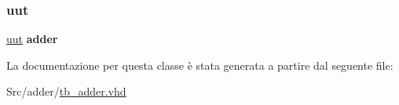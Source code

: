 \mbox{\label{classtb__adder_1_1behavior_a1619316ad715601eb5d3559db829ac05}} 
\subsubsection{\texorpdfstring{uut}{uut}}
{\footnotesize\ttfamily \hyperlink{classtb__adder_1_1behavior_a1619316ad715601eb5d3559db829ac05}{uut} {\bfseries \textcolor{vhdlchar}{adder}\textcolor{vhdlchar}{ }} \hspace{0.3cm}{\ttfamily [Instantiation]}}



La documentazione per questa classe è stata generata a partire dal seguente file\+:\begin{DoxyCompactItemize}
\item 
Src/adder/\hyperlink{tb__adder_8vhd}{tb\+\_\+adder.\+vhd}\end{DoxyCompactItemize}
